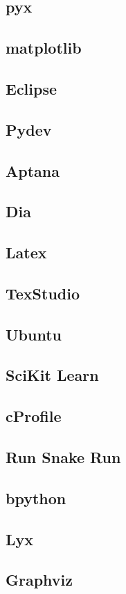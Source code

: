 \documentclass[a4paper,11pt]{report}
\begin{document}
\subsection*{pyx}
\subsection*{matplotlib}
\subsection*{Eclipse}
\subsection*{Pydev}
\subsection*{Aptana}
\subsection*{Dia}
\subsection*{Latex}
\subsection*{TexStudio}
\subsection*{Ubuntu}
\subsection*{SciKit Learn}
\subsection*{cProfile}
\subsection*{Run Snake Run}
\subsection*{bpython}
\subsection*{Lyx}
\subsection*{Graphviz}
\end{document}
